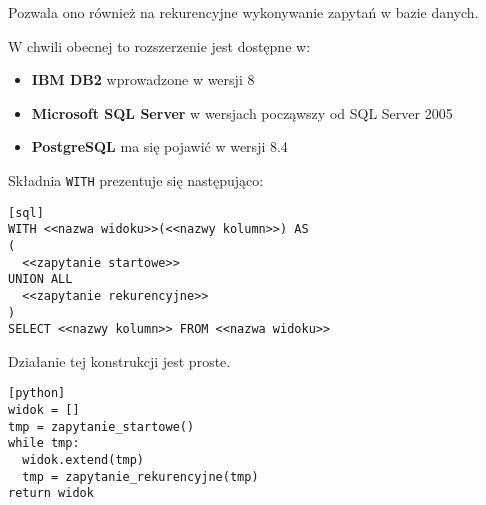 Pozwala ono również na rekurencyjne wykonywanie zapytań w bazie danych.

W chwili obecnej to rozszerzenie jest dostępne w:
\begin{itemize}
 \item \textbf{IBM DB2} wprowadzone w wersji 8
 \item \textbf{Microsoft SQL Server}
	w wersjach począwszy od SQL Server 2005
 \item \textbf{PostgreSQL}
	ma się pojawić w wersji 8.4
\end{itemize}





Składnia \texttt{WITH} prezentuje się następująco:




\begin{verbatim}[sql]
WITH <<nazwa widoku>>(<<nazwy kolumn>>) AS
(
  <<zapytanie startowe>>
UNION ALL
  <<zapytanie rekurencyjne>>
)
SELECT <<nazwy kolumn>> FROM <<nazwa widoku>>
\end{verbatim}

Działanie tej konstrukcji jest proste.

\begin{verbatim}[python]
widok = []
tmp = zapytanie_startowe()
while tmp:
  widok.extend(tmp)
  tmp = zapytanie_rekurencyjne(tmp)
return widok
\end{verbatim}

